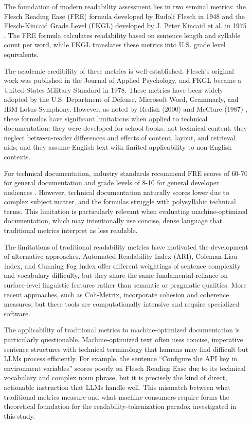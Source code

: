 \documentclass[10pt,conference,a4paper]{IEEEtran}
\begin{document}
The foundation of modern readability assessment lies in two seminal metrics: the Flesch Reading Ease (FRE) formula developed by Rudolf Flesch in 1948 \cite{Flesch1948} and the Flesch-Kincaid Grade Level (FKGL) developed by J. Peter Kincaid et al. in 1975 \cite{Kincaid1975}. The FRE formula calculates readability based on sentence length and syllable count per word, while FKGL translates these metrics into U.S. grade level equivalents.

The academic credibility of these metrics is well-established. Flesch's original work was published in the Journal of Applied Psychology, and FKGL became a United States Military Standard in 1978. These metrics have been widely adopted by the U.S. Department of Defense, Microsoft Word, Grammarly, and IBM Lotus Symphony. However, as noted by Redish (2000) \cite{Redish2000} and McClure (1987) \cite{McClure1987}, these formulas have significant limitations when applied to technical documentation: they were developed for school books, not technical content; they neglect between-reader differences and effects of content, layout, and retrieval aids; and they assume English text with limited applicability to non-English contexts.

For technical documentation, industry standards recommend FRE scores of 60-70 for general documentation and grade levels of 8-10 for general developer audiences \cite{Kincaid1988}. However, technical documentation naturally scores lower due to complex subject matter, and the formulas struggle with polysyllabic technical terms. This limitation is particularly relevant when evaluating machine-optimized documentation, which may intentionally use concise, dense language that traditional metrics interpret as less readable.

The limitations of traditional readability metrics have motivated the development of alternative approaches. Automated Readability Index (ARI), Coleman-Liau Index, and Gunning Fog Index offer different weightings of sentence complexity and vocabulary difficulty, but they share the same fundamental reliance on surface-level linguistic features rather than semantic or pragmatic qualities. More recent approaches, such as Coh-Metrix, incorporate cohesion and coherence measures, but these tools are computationally intensive and require specialized software.

The applicability of traditional metrics to machine-optimized documentation is particularly questionable. Machine-optimized text often uses concise, imperative sentence structures with technical terminology that humans may find difficult but LLMs process efficiently. For example, the sentence ``Configure the API key in environment variables'' scores poorly on Flesch Reading Ease due to its technical vocabulary and complex noun phrase, but it is precisely the kind of direct, actionable instruction that LLMs handle well. This mismatch between what traditional metrics measure and what machine consumers require forms the theoretical foundation for the readability-tokenization paradox investigated in this study.
\end{document}
